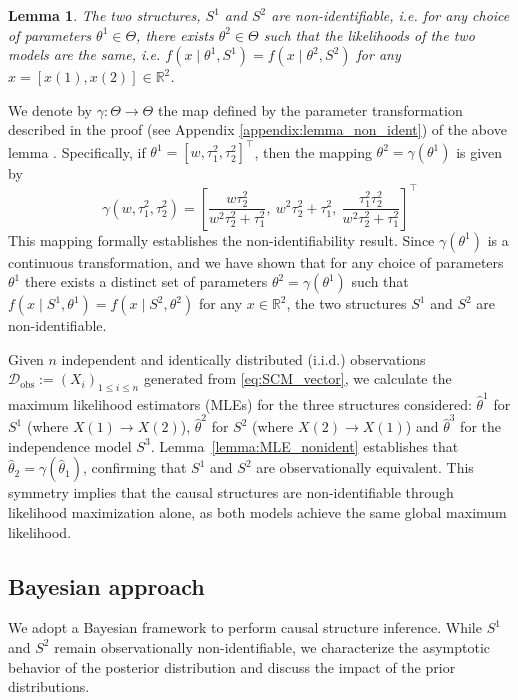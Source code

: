 \documentclass[accepted]{uai2026} %
\newcommand{\train}{\mathcal{D}}
\newcommand{\obsdata}{\train_{\text{obs}}}
\def\transpose{\intercal}
\newtheorem{lemma}{Lemma}[section]
\theoremstyle{boldremark}
\begin{document}
\begin{lemma}
\label{lemma:non_ident}
    The two structures, $S^1$ and $S^2$ are non-identifiable, i.e. for any choice of parameters $\theta^1\in \Theta$, there exists $\theta^2\in \Theta$ such that the likelihoods of the two models are the same, i.e. $f(x\mid \theta^1, S^1) = f(x\mid \theta^2, S^2)$ for any $x = [x(1), x(2)] \in \mathbb{R}^2$.
\end{lemma}

We denote by $\gamma: \Theta \to \Theta$ the map defined by the parameter transformation described in the proof (see Appendix \ref{appendix:lemma_non_ident}) of the above lemma . Specifically, if $\theta^1 = [w, \tau_1^2, \tau_2^2]^\transpose$, then the mapping $\theta^2 = \gamma(\theta^1)$ is given by
\begin{equation}
\label{eq:gamma}
\gamma(w, \tau_1^2, \tau_2^2) = \left[
\frac{w \tau_2^2}{w^2 \tau_2^2 + \tau_1^2}, \
w^2 \tau_2^2 + \tau_1^2, \
\frac{\tau_1^2 \tau_2^2}{w^2 \tau_2^2 + \tau_1^2}
\right]^\transpose
\end{equation}
This mapping formally establishes the non-identifiability result. Since $\gamma(\theta^1)$ is a continuous transformation, and we have shown that for any choice of parameters $\theta^1$ there exists a distinct set of parameters $\theta^2 = \gamma(\theta^1)$ such that $f(x \mid S^1, \theta^1) = f(x \mid S^2, \theta^2)$ for any $x\in \mathbb{R}^2$, the two structures $S^1$ and $S^2$ are non-identifiable.

Given $n$ independent and identically distributed (i.i.d.) observations $\obsdata := (X_i)_{1\leq i\leq n}$ generated from \eqref{eq:SCM_vector}, we calculate the maximum likelihood estimators (MLEs) for the three structures considered: $\hat{\theta}^1$ for $S^1$ (where $X(1)\to X(2)$),  $\hat{\theta}^2$ for $S^2$ (where $X(2) \to X(1)$) and $\hat{\theta}^3$ for the independence model $S^3$.
Lemma~\ref{lemma:MLE_nonident} establishes that $\hat{\theta}_2 = \gamma(\hat{\theta}_1)$, confirming that $S^1$ and $S^2$ are observationally equivalent. This symmetry implies that the causal structures are non-identifiable through likelihood maximization alone, as both models achieve the same global maximum likelihood.

\subsection{Bayesian approach}
We adopt a Bayesian framework to perform causal structure inference. While $S^1$ and $S^2$ remain observationally non-identifiable, we characterize the asymptotic behavior of the posterior distribution and discuss the impact of the prior distributions.
\end{document}
